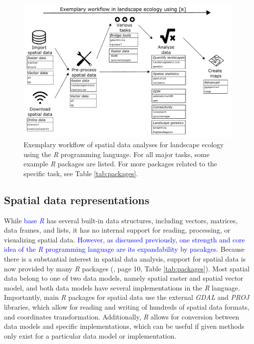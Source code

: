 \documentclass[smallextended]{svjour3}       %
\begin{document}
\begin{figure}
\includegraphics[width=\linewidth]{data/Figure_1} \caption{Exemplary workflow of spatial data analyses for landscape ecology using the \textit{R} programming language. For all major tasks, some example \textit{R} packages are listed. For more packages related to the specific task, see Table \ref{tab:packages}.}\label{fig:fig-workflow}
\end{figure}

\hypertarget{sec:spatrep}{%
\subsection{Spatial data representations}\label{sec:spatrep}}

While \textcolor{blue}{base \textit{R}} has several built-in data structures, including vectors, matrices, data frames, and lists, it has no internal support for reading, processing, or visualizing spatial data.
\textcolor{blue}{However, as discussed previously, one strength and core idea of the \textit{R} programming language are its expandability by pacakges.}
Because there is a substantial interest in spatial data analysis, support for spatial data is now provided by many \textit{R} packages (\cite{Lovelace2019}, page 10, Table \ref{tab:packages}).
Most spatial data belong to one of two data models, namely spatial raster and spatial vector model, and both data models have several implementations in the \textit{R} language.
Importantly, main \textit{R} packages for spatial data use the external \textit{GDAL} \cite{GDAL/OGRcontributors2020} and \textit{PROJ} \cite{PROJcontributors2021} libraries, which allow for reading and writing of hundreds of spatial data formats, and coordinates transformation.
Additionally, \textit{R} allows for conversion between data models and specific implementations, which can be useful if given methods only exist for a particular data model or implementation.
\end{document}
